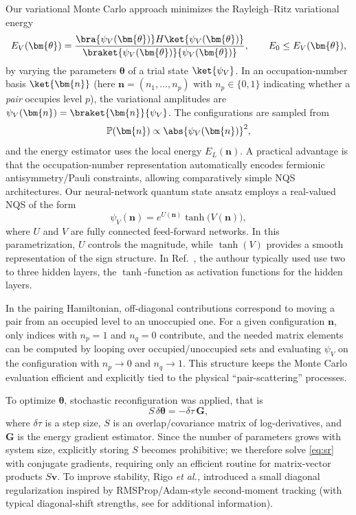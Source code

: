 Our variational Monte Carlo approach minimizes the Rayleigh--Ritz variational energy
\begin{equation}
E_V(\bm{\theta})=\frac{\bra{\psi_V(\bm{\theta})}H\ket{\psi_V(\bm{\theta})}}{\braket{\psi_V(\bm{\theta})}{\psi_V(\bm{\theta})}},
\qquad E_0\le E_V(\bm{\theta}),
\label{eq:Ev}
\end{equation}
by varying the parameters $\bm{\theta}$ of a trial state $\ket{\psi_V}$.
In an occupation-number basis $\ket{\bm{n}}$ (here $\bm{n}=(n_1,\dots,n_p)$ with $n_p\in\{0,1\}$ indicating whether
a \emph{pair} occupies level $p$), the variational amplitudes are $\psi_V(\bm{n})=\braket{\bm{n}}{\psi_V}$.
The configurations are sampled from
\begin{equation}
\mathbb{P}(\bm{n})\propto \abs{\psi_V(\bm{n})}^2,
\label{eq:prob}
\end{equation}
and the energy estimator uses the local energy $E_L(\bm{n})$.
A practical advantage is that the occupation-number representation automatically encodes
fermionic antisymmetry/Pauli constraints, allowing comparatively simple NQS architectures. 
Our neural-network quantum state ansatz employs a real-valued NQS of the form
\begin{equation}
\psi_V(\bm{n})=e^{U(\bm{n})}\tanh\!\big(V(\bm{n})\big),
\label{eq:nqs}
\end{equation}
where $U$ and $V$ are fully connected feed-forward networks. In this parametrization, $U$ controls the magnitude,
while $\tanh(V)$ provides a smooth representation of the sign structure. In Ref.~\cite{rigo2023}, the authour typically used  use two to three  hidden layers,
the $\tanh$-function as  activation functions for the hidden layers. 

In the pairing Hamiltonian, off-diagonal contributions correspond to
moving a pair from an occupied level to an unoccupied one. For a given
configuration $\bm{n}$, only indices with $n_p=1$ and $n_q=0$
contribute, and the needed matrix elements can be computed by looping
over occupied/unoccupied sets and evaluating $\psi_V$ on the
configuration with $n_p\!\to 0$ and $n_q\!\to 1$. This structure keeps
the Monte Carlo evaluation efficient and explicitly tied to the
physical ``pair-scattering'' processes.

To optimize $\bm{\theta}$, stochastic reconfiguration  \cite{Sorella:2005} was applied, that is
\begin{equation}
S\,\delta\bm{\theta}=-\delta\tau\,\bm{G},
\label{eq:sr}
\end{equation}
where $\delta\tau$ is a step size, $S$ is an overlap/covariance matrix
of log-derivatives, and $\bm{G}$ is the energy gradient
estimator. Since the number of parameters grows with system size,
explicitly storing $S$ becomes prohibitive; we therefore solve
\eqref{eq:sr} with conjugate gradients, requiring only an efficient
routine for matrix-vector products $S\bm{v}$. To improve stability,
Rigo {\em et al.,} \cite{rigo2023} introduced a small diagonal
regularization inspired by RMSProp/Adam-style second-moment tracking
(with typical diagonal-shift strengths, see \cite{rigo2023} for additional information).

